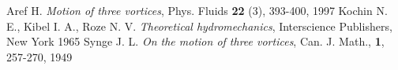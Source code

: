 \documentclass[english, a4paper]{article}
\begin{document}
\begin{thebibliography}{1}
{\small %
 Aref H.  \textit{Motion of three vortices}, Phys. Fluids \textbf{22} (3), 393-400, 1997
 Kochin N. E.,  Kibel I. A., Roze N. V. \textit{Theoretical hydromechanics}, Interscience Publishers, New York 1965
 Synge J. L. \textit{On the motion of three vortices}, Can. J. Math., \textbf{1}, 257-270, 1949
}
\end{thebibliography}
\end{document}
